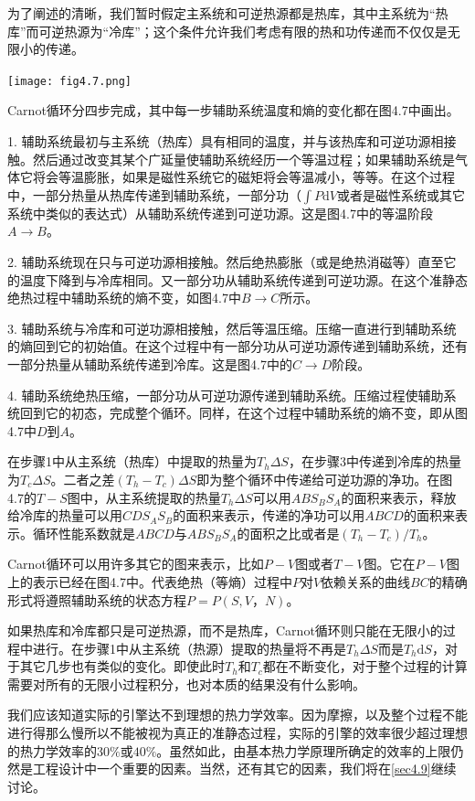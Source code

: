 为了阐述的清晰，我们暂时假定主系统和可逆热源都是热库，其中主系统为“热库”而可逆热源为“冷库”；这个条件允许我们考虑有限的热和功传递而不仅仅是无限小的传递。

{
	\centering
	\texttt{[image: fig4.7.png]}
}

Carnot循环分四步完成，其中每一步辅助系统温度和熵的变化都在图4.7中画出。

1. 辅助系统最初与主系统（热库）具有相同的温度，并与该热库和可逆功源相接触。然后通过改变其某个广延量使辅助系统经历一个等温过程；如果辅助系统是气体它将会等温膨胀，如果是磁性系统它的磁矩将会等温减小，等等。在这个过程中，一部分热量从热库传递到辅助系统，一部分功（$\int P\text{d}V$或者是磁性系统或其它系统中类似的表达式）从辅助系统传递到可逆功源。这是图4.7中的等温阶段$A\rightarrow B$。

2. 辅助系统现在只与可逆功源相接触。然后绝热膨胀（或是绝热消磁等）直至它的温度下降到与冷库相同。又一部分功从辅助系统传递到可逆功源。在这个准静态绝热过程中辅助系统的熵不变，如图4.7中$B\rightarrow C$所示。

3. 辅助系统与冷库和可逆功源相接触，然后等温压缩。压缩一直进行到辅助系统的熵回到它的初始值。在这个过程中有一部分功从可逆功源传递到辅助系统，还有一部分热量从辅助系统传递到冷库。这是图4.7中的$C\rightarrow D$阶段。

4. 辅助系统绝热压缩，一部分功从可逆功源传递到辅助系统。压缩过程使辅助系统回到它的初态，完成整个循环。同样，在这个过程中辅助系统的熵不变，即从图4.7中$D$到$A$。

在步骤1中从主系统（热库）中提取的热量为$T_h\Delta S$，在步骤3中传递到冷库的热量为$T_c\Delta S$。二者之差$(T_h - T_c)\Delta S$即为整个循环中传递给可逆功源的净功。在图4.7的$T-S$图中，从主系统提取的热量$T_h\Delta S$可以用$ABS_BS_A$的面积来表示，释放给冷库的热量可以用$CDS_AS_B$的面积来表示，传递的净功可以用$ABCD$的面积来表示。循环性能系数就是$ABCD$与$ABS_BS_A$的面积之比或者是$(T_h - T_c)/T_h$。

Carnot循环可以用许多其它的图来表示，比如$P-V$图或者$T-V$图。它在$P-V$图上的表示已经在图4.7中。代表绝热（等熵）过程中$P$对$V$依赖关系的曲线$BC$的精确形式将遵照辅助系统的状态方程$P = P(S,V，N)$。

如果热库和冷库都只是可逆热源，而不是热库，Carnot循环则只能在无限小的过程中进行。在步骤1中从主系统（热源）提取的热量将不再是$T_h\Delta S$而是$T_h\text{d}S$，对于其它几步也有类似的变化。即使此时$T_h$和$T_c$都在不断变化，对于整个过程的计算需要对所有的无限小过程积分，也对本质的结果没有什么影响。

我们应该知道实际的引擎达不到理想的热力学效率。因为摩擦，以及整个过程不能进行得那么慢所以不能被视为真正的准静态过程，实际的引擎的效率很少超过理想的热力学效率的$30\%$或$40\%$。虽然如此，由基本热力学原理所确定的效率的上限仍然是工程设计中一个重要的因素。当然，还有其它的因素，我们将在\ref{sec4.9}继续讨论。

